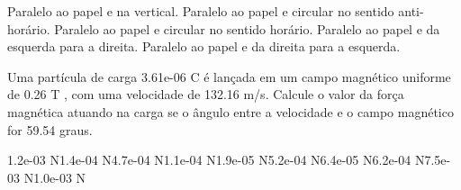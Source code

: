 \documentclass[12pt, addpoints]{exam}
\begin{document}
\begin{questions}
\begin{multicols*}{2}
        

\begin{choices}
\choice Paralelo ao papel e na vertical. 
\choice Paralelo ao papel e circular no sentido anti-horário. 
\choice Paralelo ao papel e circular no sentido horário. 
\choice Paralelo ao papel e da esquerda para a direita. 
\choice Paralelo ao papel e da direita para a esquerda. 
\end{choices}
\question Uma partícula de carga 3.61e-06 C é lançada em um campo magnético uniforme de    0.26 T , com uma velocidade de 132.16 m/s. Calcule o valor da força magnética atuando na carga se o ângulo entre a velocidade e o campo magnético for   59.54 graus.

\begin{oneparchoices}
\choice 1.2e-03 N\choice 1.4e-04 N\choice 4.7e-04 N\choice 1.1e-04 N\choice 1.9e-05 N\choice 5.2e-04 N\choice 6.4e-05 N\choice 6.2e-04 N\choice 7.5e-03 N\choice 1.0e-03 N
\end{oneparchoices}\end{multicols*}
\end{questions}
\newpage
\end{document}
